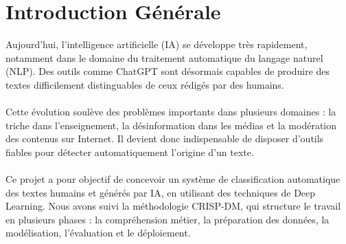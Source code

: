 \chapter*{Introduction Générale}

Aujourd'hui, l'intelligence artificielle (IA) se développe très rapidement, notamment
dans le domaine du traitement automatique du langage naturel (NLP). Des outils comme
ChatGPT sont désormais capables de produire des textes difficilement distinguables de
ceux rédigés par des humains.
\\
\\
Cette évolution soulève des problèmes importants dans plusieurs domaines : la triche
dans l'enseignement, la désinformation dans les médias et la modération des contenus
sur Internet. Il devient donc indispensable de disposer d'outils fiables pour détecter
automatiquement l'origine d'un texte.
\\
\\
Ce projet a pour objectif de concevoir un système de classification automatique des
textes humains et générés par IA, en utilisant des techniques de Deep Learning. Nous
avons suivi la méthodologie CRISP-DM, qui structure le travail en plusieurs phases :
la compréhension métier, la préparation des données, la modélisation, l'évaluation
et le déploiement.
\\
\\